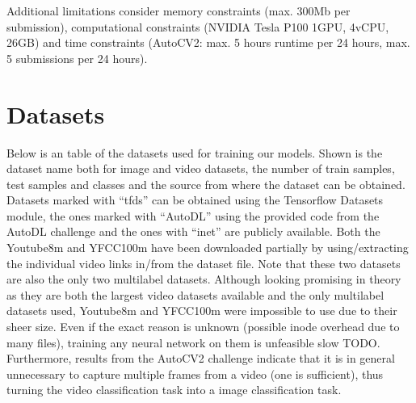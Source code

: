 \documentclass{article}
\begin{document}
Additional limitations consider memory constraints (max. 300Mb per submission), computational constraints (NVIDIA Tesla P100 1GPU, 4vCPU, 26GB) and time constraints (AutoCV2: max. 5 hours runtime per 24 hours, max. 5 submissions per 24 hours).


\section{Datasets}
\label{sec:datasets}
Below is an table of the datasets used for training our models. Shown is the dataset name both for image and video datasets, the number of train samples, test samples and classes and the source from where the dataset can be obtained. Datasets marked with ``tfds'' can be obtained using the Tensorflow Datasets module, the ones marked with ``AutoDL'' using the provided code from the AutoDL challenge and the ones with ``inet'' are publicly available. Both the Youtube8m and YFCC100m have been downloaded partially by using/extracting the individual video links in/from the dataset file. Note that these two datasets are also the only two multilabel datasets.
Although looking promising in theory as they are both the largest video datasets available and the only multilabel datasets used, Youtube8m and YFCC100m were impossible to use due to their sheer size. Even if the exact reason is unknown (possible inode overhead due to many files), training any neural network on them is unfeasible slow TODO.
Furthermore, results from the AutoCV2 challenge indicate that it is in general unnecessary to capture multiple frames from a video (one is sufficient), thus turning the video classification task into a image classification task.
\end{document}
